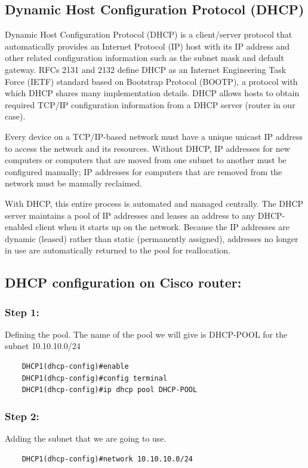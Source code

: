 \subsection{Dynamic Host Configuration Protocol (DHCP)}
Dynamic Host Configuration Protocol (DHCP) is a client/server protocol that automatically provides an Internet Protocol (IP) host with its IP address and other related configuration information such as the subnet mask and default gateway. RFCs 2131 and 2132 define DHCP as an Internet Engineering Task Force (IETF) standard based on Bootstrap Protocol (BOOTP), a protocol with which DHCP shares many implementation details. DHCP allows hosts to obtain required TCP/IP configuration information from a DHCP server (router in our case).

Every device on a TCP/IP-based network must have a unique unicast IP address to access the network and its resources. Without DHCP, IP addresses for new computers or computers that are moved from one subnet to another must be configured manually; IP addresses for computers that are removed from the network must be manually reclaimed.

With DHCP, this entire process is automated and managed centrally. The DHCP server maintains a pool of IP addresses and leases an address to any DHCP-enabled client when it starts up on the network. Because the IP addresses are dynamic (leased) rather than static (permanently assigned), addresses no longer in use are automatically returned to the pool for reallocation.

\subsection{DHCP configuration on Cisco router:}
\subsubsection{Step 1:}
Defining the pool. The name of the pool we will give is DHCP-POOL for the subnet 10.10.10.0/24
\begin{verbatim}
    DHCP1(dhcp-config)#enable
    DHCP1(dhcp-config)#config terminal
    DHCP1(dhcp-config)#ip dhcp pool DHCP-POOL
\end{verbatim}
\subsubsection{Step 2:}
Adding the subnet that we are going to use.
\begin{verbatim}
    DHCP1(dhcp-config)#network 10.10.10.0/24
\end{verbatim}

